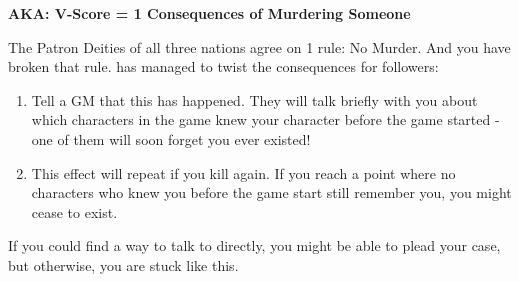 \documentclass[green]{GL2020}
\begin{document}
\name{\gMurderChup{}}

\textbf{AKA: V-Score = 1 Consequences of Murdering Someone}

The Patron Deities of all three nations agree on 1 rule: No Murder. And you have broken that rule. \cGenesis{} has managed to twist the consequences for \cGenesis{\their} followers:

\begin{enumerate}
  \item Tell a GM that this has happened. They will talk briefly with you about which characters in the game knew your character before the game started - one of them will soon forget you ever existed!
  \item This effect will repeat if you kill again. If you reach a point where no characters who knew you before the game start still remember you, you might cease to exist.
\end{enumerate}

If you could find a way to talk to \cGenesis directly, you might be able to plead your case, but otherwise, you are stuck like this.
\end{document}
